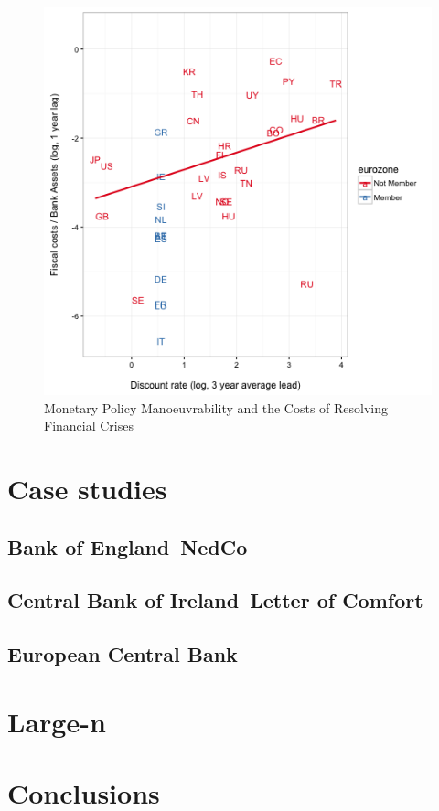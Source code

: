 \documentclass[]{article}
\begin{document}
\begin{figure}
    \caption{Monetary Policy Manoeuvrability and the Costs of Resolving Financial Crises}
    \label{mpcost}
    \centering
    \includegraphics[scale=0.5]{figures/DiscountRate_CostsStnd.png}

\end{figure}

\section{Case studies}

\subsection{Bank of England--NedCo}


\subsection{Central Bank of Ireland--Letter of Comfort}


\subsection{European Central Bank}


\section{Large-n}


\section{Conclusions}
\end{document}

